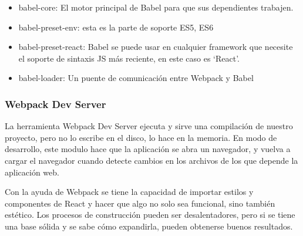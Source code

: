 \begin{itemize}
  \item babel-core: El motor principal de Babel para que sus dependientes trabajen.

  \item babel-preset-env: esta es la parte de soporte ES5, ES6

  \item babel-preset-react: Babel se puede usar en cualquier framework que necesite el soporte de sintaxis JS más reciente, en este caso es `React'.

  \item babel-loader: Un puente de comunicación entre Webpack y Babel
\end{itemize}
\vspace{0.8cm}





\subsubsection{Webpack Dev Server}
La herramienta Webpack Dev Server ejecuta y sirve una compilación de nuestro proyecto, pero no lo escribe en el disco, lo hace en la memoria. En modo de desarrollo, este modulo hace que la aplicación se abra un navegador, y vuelva a cargar el navegador cuando detecte cambios en los archivos de los que depende la aplicación web.
\vspace{0.8cm}



Con la ayuda de Webpack se tiene la capacidad de importar estilos y componentes de React y hacer que algo no solo sea funcional, sino también estético. Los procesos de construcción pueden ser desalentadores, pero si se tiene una base sólida y se sabe cómo expandirla, pueden obtenerse buenos resultados.
\vspace{0.8cm}

